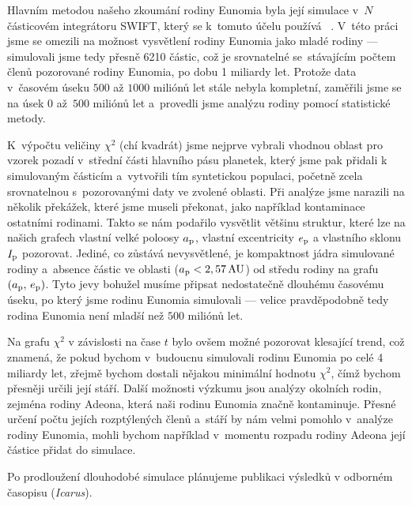 \documentclass[A4paper, 12pt, oneside]{book}
\begin{document}
Hlavním metodou našeho zkoumání rodiny Eunomia byla její simulace v~$N$ částicovém integrátoru SWIFT, který se k~tomuto účelu používá~\cite{levison94} \cite{broz11}. V~této práci jsme se omezili na možnost vysvětlení rodiny Eunomia jako mladé rodiny --- simulovali jsme tedy přesně 6210 částic, což je srovnatelné se~stávajícím počtem členů pozorované rodiny Eunomia, po dobu 1 miliardy let. Protože data v~časovém úseku $500$ až $1000$ miliónů let stále nebyla kompletní, zaměřili jsme se na úsek $0$ až~$500$ miliónů let a~provedli jsme analýzu rodiny pomocí statistické metody.

K~výpočtu veličiny $\chi^2$ (chí kvadrát) jsme nejprve vybrali vhodnou oblast pro vzorek pozadí v~střední části hlavního pásu planetek, který jsme pak přidali k simulovaným částicím a~vytvořili tím syntetickou populaci, početně zcela srovnatelnou s~pozorovanými daty ve zvolené oblasti. Při analýze jsme narazili na několik překážek, které jsme museli překonat, jako například kontaminace ostatními rodinami. Takto se nám podařilo vysvětlit většinu struktur, které lze na našich grafech vlastní velké poloosy $a_{\rm p}$, vlastní excentricity $e_{\rm p}$ a vlastního sklonu $I_{\rm p}$ pozorovat. Jediné, co zůstává nevysvětlené, je kompaktnost jádra simulované rodiny a~absence částic ve oblasti  ($a_{\rm p}<2,57\,{\rm AU}$) od středu rodiny na grafu $(a_{\rm p},\,e_{\rm p})$. Tyto jevy bohužel musíme připsat nedostatečně dlouhému časovému úseku, po který jsme rodinu Eunomia simulovali --- velice pravděpodobně tedy rodina Eunomia není mladší než $500$ miliónů let.

Na grafu $\chi^2$ v závislosti na čase $t$ bylo ovšem možné pozorovat klesající trend, což znamená, že pokud bychom v~budoucnu simulovali rodinu Eunomia po celé 4 miliardy let, zřejmě bychom dostali nějakou minimální hodnotu $\chi^2$, čímž bychom přesněji určili její stáří. Další možnosti výzkumu jsou analýzy okolních rodin, zejména rodiny Adeona, která naši rodinu Eunomia značně kontaminuje. Přesné určení počtu jejích rozptýlených členů a~stáří by nám velmi pomohlo v~analýze rodiny Eunomia, mohli bychom například v~momentu rozpadu rodiny Adeona její částice přidat do simulace.

Po prodloužení dlouhodobé simulace plánujeme publikaci výsledků v odborném časopisu (\textit{Icarus}).

\newpage
\end{document}
